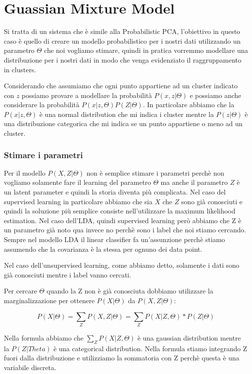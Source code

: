 \documentclass[14pt]{extreport}
\begin{document}
\section{Guassian Mixture Model}

Si tratta di un sistema che è simile alla Probabilistic PCA, l'obiettivo in questo caso è quello di creare un modello probabilistico per i nostri dati 
utilizzando un parametro $\Theta$ che noi vogliamo stimare, quindi in pratica vorremmo modellare una distribuzione per i nostri dati in modo che venga 
evidenziato il raggruppamento in clusters.

Considerando che assumiamo che ogni punto appartiene ad un cluster indicato con $z$ possiamo provare a modellare la probabilità $P(x,z | \Theta)$ e possiamo anche considerare
la probabilità $P(x|z,\Theta)P(Z|\Theta)$.
In particolare abbiamo che la $P(x|z,\Theta)$ è una normal distribution che mi indica i cluster mentre la $P(z|\Theta)$ è una distribuzione categorica 
che mi indica se un punto appartiene o meno ad un cluster.

\subsubsection{Stimare i parametri}

Per il modello $P(X, Z | \Theta)$ non è semplice stimare i parametri perchè non vogliamo solamente fare il learning del parametro $\Theta$ ma anche il parametro 
$Z$ è un latent parameter e quindi la storia diventa più complicata.
Nel caso del supervised learning in particolare abbiamo che sia $X$ che $Z$ sono già conosciuti e quindi la soluzione più semplice consiste nell'utilizzare la 
maximum likelihood estimation. Nel caso dell'LDA, quindi supervised learning però abbiamo che Z è un parametro già noto qua invece no perchè sono i label che noi stiamo cercando.
Sempre nel modello LDA il linear classifier fa un'assunzione perchè stiamo assumendo che la covarianza è la stessa per ognuno dei data point.

Nel caso dell'unsupervised learning, come abbiamo detto, solamente i dati sono già conosciuti mentre i label vanno cercati.

Per cercare $\Theta$ quando la Z non è già conosciuta dobbiamo utilizzare la marginalizzazione per ottenere $P(X|\Theta)$ da $P(X,Z|\Theta)$:

$$ P(X | \Theta ) = \sum_{Z}{P(X , Z | \Theta )} = \sum_{Z} P(X | Z, \Theta ) * P( Z | \Theta) $$

Nella formula abbiamo che $\sum_{Z} P(X | Z, \Theta)$ è una gaussian distribution mentre la $P(Z | Theta)$ è una categorical distribution.
Nella formula stiamo integrando Z fuori dalla distribuzione e utilizziamo la sommatoria con Z perchè questa è una variabile discreta.
\end{document}
